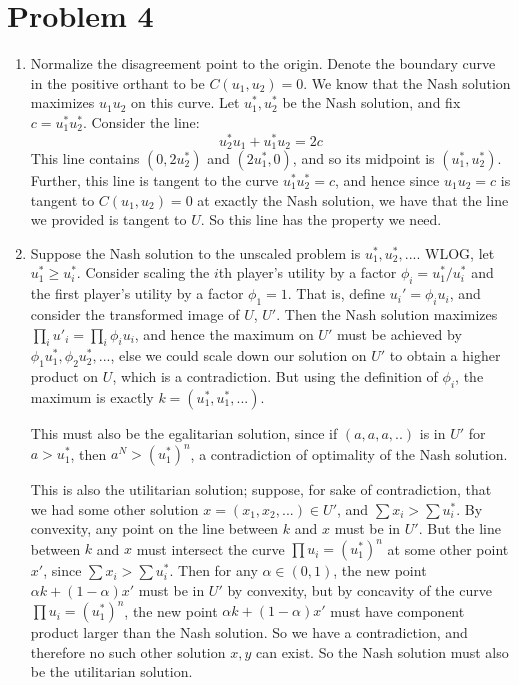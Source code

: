\documentclass[10pt,letter]{article}
\begin{document}
\section*{Problem 4}
\begin{enumerate}[label=(\alph*)]
\item Normalize the disagreement point to the origin. Denote the boundary curve in the positive orthant to be $C(u_1,u_2 ) = 0$. We know that the Nash solution maximizes $u_1u_2$ on this curve. Let $u_1^*, u_2^*$ be the Nash solution, and fix $c=u_1^*u_2^*$. Consider the line:
\[ u_2^* u_1 + u_1^* u_2 = 2c \]
This line contains $(0, 2u_2^*)$ and $(2u_1^*, 0)$, and so its midpoint is $(u_1^*, u_2^*)$. Further, this line is tangent to the curve $u_1^*u_2^* = c$, and hence since $u_1u_2 = c$ is tangent to $C(u_1, u_2) = 0$ at exactly the Nash solution, we have that the line we provided is tangent to $U$. So this line has the property we need.
\item Suppose the Nash solution to the unscaled problem is $u_1^*, u_2^*, ...$. WLOG, let $u_1^* \ge u_i^*$. Consider scaling the $i$th player's utility by a factor $\phi_i = u_1^*/u_i^*$ and the first player's utility by a factor $\phi_1 = 1$. That is, define $u_i' = \phi_i u_i$, and consider the transformed image of $U$, $U'$.
Then the Nash solution maximizes $\prod_i u'_i = \prod_i \phi_i u_i$, and hence the maximum on $U'$ must be achieved by $\phi_1 u_1^*, \phi_2 u_2^*, ...$, else we could scale down our solution on $U'$ to obtain a higher product on $U$, which is a contradiction.
But using the definition of $\phi_i$, the maximum is exactly $k = (u_1^* , u_1^*, ... )$.

This must also be the egalitarian solution, since if $(a, a, a, ..)$ is in $U'$ for $a > u_1^*$, then $a^N > (u_1^*)^n$, a contradiction of optimality of the Nash solution.

This is also the utilitarian solution; suppose, for sake of contradiction, that we had some other solution $x = (x_1, x_2, ...) \in U'$, and $\sum x_i > \sum u_i^* $. By convexity, any point on the line between $k$ and $x$ must be in $U'$. But the line between $k$ and $x$ must intersect the curve $\prod u_i = (u_1^*)^n$ at some other point $x'$, since $\sum x_i > \sum u_i^* $.
Then for any $\alpha \in (0,1)$, the new point $\alpha k + (1-\alpha) x'$ must be in $U'$ by convexity, but by concavity of the curve $\prod u_i = (u_1^*)^n$, the new point $\alpha k + (1-\alpha) x'$ must have component product larger than the Nash solution. So we have a contradiction, and therefore no such other solution $x,y$ can exist. So the Nash solution must also be the utilitarian solution.
\end{enumerate}
\end{document}
